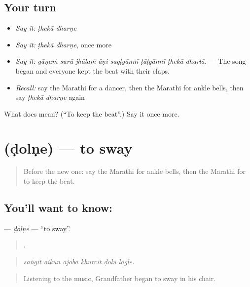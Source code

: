\subsection*{Your turn}
\begin{itemize}
\raggedright
  \item \emph{Say it:} \emph{ṭhekā dharṇe}
  \item \emph{Say it:} \emph{ṭhekā dharṇe}, once more
  \item \emph{Say it:} \emph{gāṇaṁ surū jhālaṁ āṇi sagḷyānnī ṭāḷyānnī ṭhekā dharlā.} — The song began and everyone kept the beat with their claps.
  \item \emph{Recall:} say the Marathi for a dancer, then the Marathi for ankle bells, then say \emph{ṭhekā dharṇe} again
\end{itemize}

\begin{tcolorbox}[breakable,colback=teal!4,colframe=teal!35!black,title={Before you move on}]
What does   mean? (\textquotedblleft{}To keep the beat\textquotedblright{}.) Say it once more.
\end{tcolorbox}
\section[\texorpdfstring{\mr{डोलणे} (ḍolṇe)}{डोलणे (ḍolṇe)}]{ (ḍolṇe) — to sway}

\label{lesson:MR-C538-dolne}



\begin{quote}
Before the new one: say the Marathi for ankle bells, then the Marathi for to keep the beat.
\end{quote}

\subsection*{You'll want to know: }
\textbf{} — \emph{ḍolṇe} — \textquotedblleft{}to sway\textquotedblright{}.

\begin{quote}
     .
\end{quote}

\begin{quote}
\emph{saṅgīt aikūn ājobā khurcīt ḍolū lāgle.}
\end{quote}

\begin{quote}
Listening to the music, Grandfather began to sway in his chair.
\end{quote}

